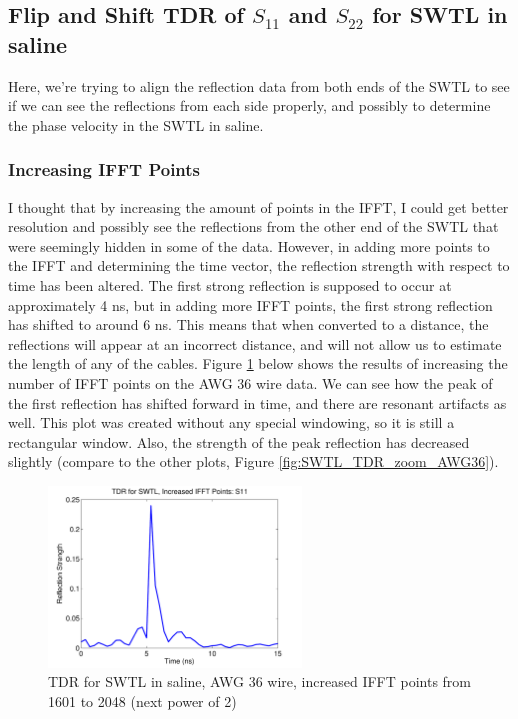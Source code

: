 \documentclass[12pt,onecolumn,titlepage]{article}
\begin{document}
\subsection{Flip and Shift TDR of $S_{11}$ and $S_{22}$ for SWTL in saline}
\indent \indent Here, we're trying to align the reflection data from both ends of the SWTL to see if we can see the reflections from each side properly, and possibly to determine the phase velocity in the SWTL in saline.

\subsubsection{Increasing IFFT Points}
\indent \indent I thought that by increasing the amount of points in the IFFT, I could get better resolution and possibly see the reflections from the other end of the SWTL that were seemingly hidden in some of the data. However, in adding more points to the IFFT and determining the time vector, the reflection strength with respect to time has been altered. The first strong reflection is supposed to occur at approximately 4 ns, but in adding more IFFT points, the first strong reflection has shifted to around 6 ns. This means that when converted to a distance, the reflections will appear at an incorrect distance, and will not allow us to estimate the length of any of the cables. Figure \ref{fig:SWTL_TDR_AWG36_s11_incrIFFT} below shows the results of increasing the number of IFFT points on the AWG 36 wire data. We can see how the peak of the first reflection has shifted forward in time, and there are resonant artifacts as well. This plot was created without any special windowing, so it is still a rectangular window. Also, the strength of the peak reflection has decreased slightly (compare to the other plots, Figure \ref{fig:SWTL_TDR_zoom_AWG36}).



\begin{figure}[htbp]
	\centering
	\includegraphics[width=0.6\textwidth]{Pictures/22July2013/SWTL_TDR_AWG36_s11_incrIFFT}
	\caption{ TDR for SWTL in saline, AWG 36 wire, increased IFFT points from 1601 to 2048 (next power of 2) } 
	\label{fig:SWTL_TDR_AWG36_s11_incrIFFT}
\end{figure}
\end{document}
